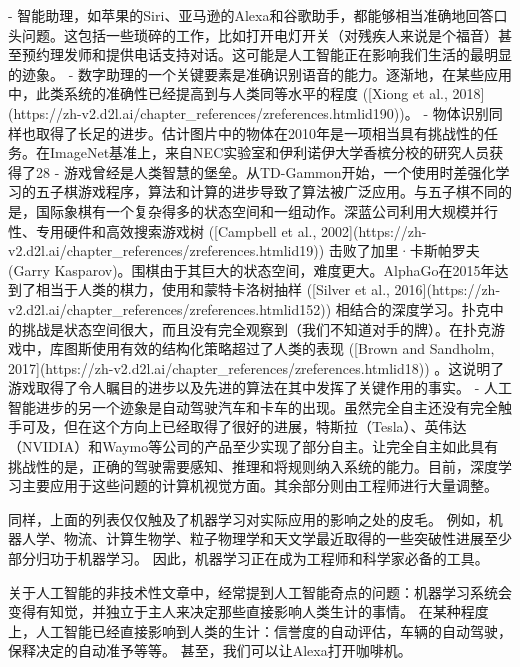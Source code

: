 - 智能助理，如苹果的Siri、亚马逊的Alexa和谷歌助手，都能够相当准确地回答口头问题。这包括一些琐碎的工作，比如打开电灯开关（对残疾人来说是个福音）甚至预约理发师和提供电话支持对话。这可能是人工智能正在影响我们生活的最明显的迹象。
- 数字助理的一个关键要素是准确识别语音的能力。逐渐地，在某些应用中，此类系统的准确性已经提高到与人类同等水平的程度 ([Xiong et al., 2018](https://zh-v2.d2l.ai/chapter\_references/zreferences.htmlid190))。
- 物体识别同样也取得了长足的进步。估计图片中的物体在2010年是一项相当具有挑战性的任务。在ImageNet基准上，来自NEC实验室和伊利诺伊大学香槟分校的研究人员获得了28%
- 游戏曾经是人类智慧的堡垒。从TD-Gammon开始，一个使用时差强化学习的五子棋游戏程序，算法和计算的进步导致了算法被广泛应用。与五子棋不同的是，国际象棋有一个复杂得多的状态空间和一组动作。深蓝公司利用大规模并行性、专用硬件和高效搜索游戏树 ([Campbell et al., 2002](https://zh-v2.d2l.ai/chapter\_references/zreferences.htmlid19)) 击败了加里·卡斯帕罗夫(Garry Kasparov)。围棋由于其巨大的状态空间，难度更大。AlphaGo在2015年达到了相当于人类的棋力，使用和蒙特卡洛树抽样 ([Silver et al., 2016](https://zh-v2.d2l.ai/chapter\_references/zreferences.htmlid152)) 相结合的深度学习。扑克中的挑战是状态空间很大，而且没有完全观察到（我们不知道对手的牌）。在扑克游戏中，库图斯使用有效的结构化策略超过了人类的表现 ([Brown and Sandholm, 2017](https://zh-v2.d2l.ai/chapter\_references/zreferences.htmlid18)) 。这说明了游戏取得了令人瞩目的进步以及先进的算法在其中发挥了关键作用的事实。
- 人工智能进步的另一个迹象是自动驾驶汽车和卡车的出现。虽然完全自主还没有完全触手可及，但在这个方向上已经取得了很好的进展，特斯拉（Tesla）、英伟达（NVIDIA）和Waymo等公司的产品至少实现了部分自主。让完全自主如此具有挑战性的是，正确的驾驶需要感知、推理和将规则纳入系统的能力。目前，深度学习主要应用于这些问题的计算机视觉方面。其余部分则由工程师进行大量调整。

同样，上面的列表仅仅触及了机器学习对实际应用的影响之处的皮毛。 例如，机器人学、物流、计算生物学、粒子物理学和天文学最近取得的一些突破性进展至少部分归功于机器学习。 因此，机器学习正在成为工程师和科学家必备的工具。

关于人工智能的非技术性文章中，经常提到人工智能奇点的问题：机器学习系统会变得有知觉，并独立于主人来决定那些直接影响人类生计的事情。 在某种程度上，人工智能已经直接影响到人类的生计：信誉度的自动评估，车辆的自动驾驶，保释决定的自动准予等等。 甚至，我们可以让Alexa打开咖啡机。

